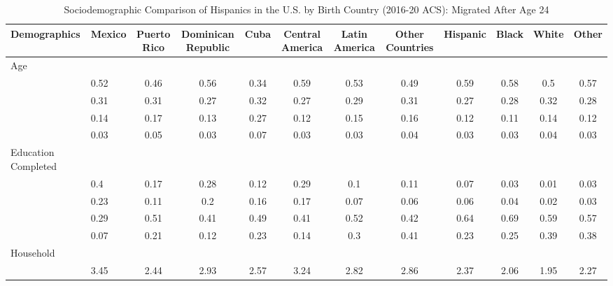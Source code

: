 \documentclass[
]{article}
\begin{document}
\begin{landscape}

\begin{table}[ht]
\centering
\caption{Sociodemographic Comparison of Hispanics in the U.S. by Birth Country (2016-20 ACS): Migrated After Age 24} 
\begingroup\small
\begin{tabular}{>{\raggedright\arraybackslash}p{3.2cm}|lcccccc|cccc}
  \hline
Demographics & Mexico & Puerto Rico & Dominican Republic & Cuba & Central America & Latin America & Other Countries & Hispanic & Black & White & Other \\ 
  \hline
Age &  &  &  &  &  &  &  &  &  &  &  \\ 
  \multicolumn{1}{>{\raggedleft\arraybackslash}p{1.5cm}|}{\makebox[1.5cm][r]{60 - 69 }}& 0.52 & 0.46 & 0.56 & 0.34 & 0.59 & 0.53 & 0.49 & 0.59 & 0.58 & 0.5 & 0.57 \\ 
  \multicolumn{1}{>{\raggedleft\arraybackslash}p{1.5cm}|}{\makebox[1.5cm][r]{70 - 79 }}& 0.31 & 0.31 & 0.27 & 0.32 & 0.27 & 0.29 & 0.31 & 0.27 & 0.28 & 0.32 & 0.28 \\ 
  \multicolumn{1}{>{\raggedleft\arraybackslash}p{1.5cm}|}{\makebox[1.5cm][r]{80 - 89 }}& 0.14 & 0.17 & 0.13 & 0.27 & 0.12 & 0.15 & 0.16 & 0.12 & 0.11 & 0.14 & 0.12 \\ 
  \multicolumn{1}{>{\raggedleft\arraybackslash}p{1.5cm}|}{\makebox[1.5cm][r]{90 plus }}& 0.03 & 0.05 & 0.03 & 0.07 & 0.03 & 0.03 & 0.04 & 0.03 & 0.03 & 0.04 & 0.03 \\ 
  Education Completed &  &  &  &  &  &  &  &  &  &  &  \\ 
  \multicolumn{1}{>{\raggedleft\arraybackslash}p{3.2cm}|}{\makebox[3.2cm][r]{Less than Primary }}& 0.4 & 0.17 & 0.28 & 0.12 & 0.29 & 0.1 & 0.11 & 0.07 & 0.03 & 0.01 & 0.03 \\ 
  \multicolumn{1}{>{\raggedleft\arraybackslash}p{1.7cm}|}{\makebox[1.7cm][r]{Primary }}& 0.23 & 0.11 & 0.2 & 0.16 & 0.17 & 0.07 & 0.06 & 0.06 & 0.04 & 0.02 & 0.03 \\ 
  \multicolumn{1}{>{\raggedleft\arraybackslash}p{2cm}|}{\makebox[2cm][r]{Secondary }}& 0.29 & 0.51 & 0.41 & 0.49 & 0.41 & 0.52 & 0.42 & 0.64 & 0.69 & 0.59 & 0.57 \\ 
  \multicolumn{1}{>{\raggedleft\arraybackslash}p{2cm}|}{\makebox[2cm][r]{University }}& 0.07 & 0.21 & 0.12 & 0.23 & 0.14 & 0.3 & 0.41 & 0.23 & 0.25 & 0.39 & 0.38 \\ 
  Household &  &  &  &  &  &  &  &  &  &  &  \\ 
  \multicolumn{1}{>{\raggedleft\arraybackslash}p{2.7cm}|}{\makebox[2.7cm][r]{Household Size }}& 3.45 & 2.44 & 2.93 & 2.57 & 3.24 & 2.82 & 2.86 & 2.37 & 2.06 & 1.95 & 2.27 \\ 

\end{tabular}
\end{table}
\end{landscape}
\end{document}
